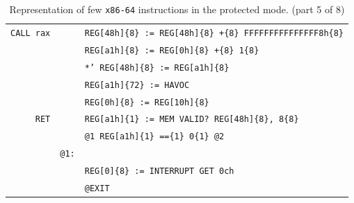 \documentclass[10pt,twocolumn]{article}
\begin{document}
\begin{table}[!h]
\begin{center}
\begin{tabular}{r|rl}
\texttt{CALL rax} & %
& \texttt{REG[48h]\{8\} := REG[48h]\{8\} +\{8\} FFFFFFFFFFFFFFF8h\{8\}} \\ & %
& \texttt{REG[a1h]\{8\} := REG[0h]\{8\} +\{8\} 1\{8\}} \\ & %
& \texttt{*' REG[48h]\{8\} := REG[a1h]\{8\}} \\ & %
& \texttt{REG[a1h]\{72\} := HAVOC} \\ & %
& \texttt{REG[0h]\{8\} := REG[10h]\{8\}} \\ \hline

\texttt{RET} & %
& \texttt{REG[a1h]\{1\} := MEM VALID? REG[48h]\{8\}, 8\{8\}} \\ & %
& \texttt{@1 REG[a1h]\{1\} ==\{1\} 0\{1\} @2} \\ & %
\texttt{@1:} \\ & %
& \texttt{REG[0]\{8\} := INTERRUPT GET 0ch} \\ & %
& \texttt{@EXIT} %

\end{tabular}
\end{center}
\caption{Representation of few \texttt{x86-64} instructions in the
protected mode. (part 5 of 8)}
\end{table}

\clearpage
\end{document}
